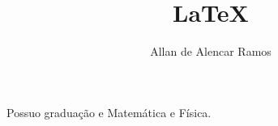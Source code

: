 \documentclass[12pt, a4paper, oneside]{book}
\begin{document}
\title{LaTeX}
\author{Allan de Alencar Ramos}
\maketitle

Possuo  graduação e   Matemática e  Física.

\printindex
\end{document}

